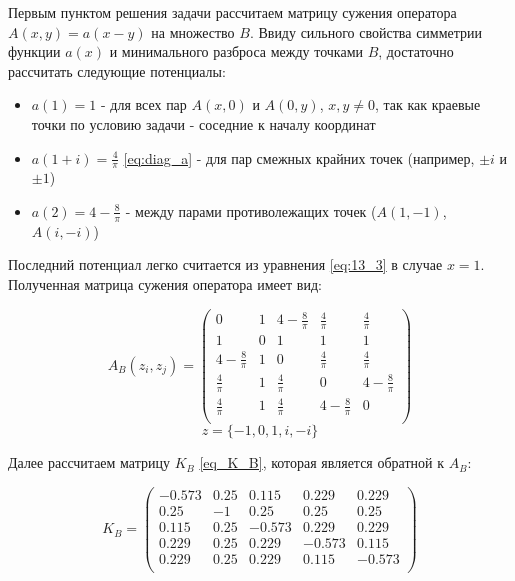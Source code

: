 Первым пунктом решения задачи рассчитаем матрицу сужения оператора $A(x,y) = a(x-y)$ на множество $B$.
Ввиду сильного свойства симметрии функции $a(x)$ и минимального разброса между точками $B$, достаточно рассчитать следующие потенциалы:

\begin{itemize}
\item $a(1) = 1$ - для всех пар $A(x,0)$ и $A(0,y)$, $x, y \neq 0$, так как краевые точки по условию задачи - соседние к началу координат
\item $a(1+i) = \frac{4}{\pi}$ \eqref{eq:diag_a} - для пар смежных крайних точек (например, $\pm i$ и $ \pm 1$)
\item $a(2) = 4 - \frac{8}{\pi}$ - между парами противолежащих точек ($A(1,-1)$, $A(i,-i)$)  
\end{itemize} 

Последний потенциал легко считается из уравнения \eqref{eq:13_3} в случае $x = 1$.
Полученная матрица сужения оператора имеет вид:

\begin{equation}
A_B(z_i, z_j) = 
	\begin{pmatrix}
		0 & 1 & 4 - \frac{8}{\pi} & \frac{4}{\pi} & \frac{4}{\pi} \\
		1 & 0 & 1 & 1 & 1 \\
		4 - \frac{8}{\pi} & 1 & 0 & \frac{4}{\pi} & \frac{4}{\pi}\\
		\frac{4}{\pi} & 1 & \frac{4}{\pi} & 0 & 4 - \frac{8}{\pi}\\
		\frac{4}{\pi} & 1 & \frac{4}{\pi} & 4 - \frac{8}{\pi} & 0 \\
	\end{pmatrix}
\end{equation}
\[ z = \{ -1, 0, 1, i, -i \} \]

Далее рассчитаем матрицу $K_B$ \ref{eq_K_B}, которая является обратной к $A_B$:

\begin{equation}
K_B = 
	\begin{pmatrix}
		-0.573 & 0.25 & 0.115 & 0.229 & 0.229 \\
		0.25 & -1 & 0.25 & 0.25 & 0.25\\
		0.115 & 0.25 & -0.573 & 0.229 &  0.229\\
		0.229 & 0.25 & 0.229 & -0.573 & 0.115\\
		0.229 & 0.25 & 0.229 & 0.115 & -0.573\\
	\end{pmatrix}
\end{equation}

